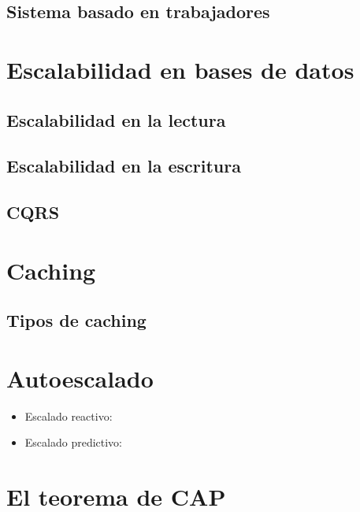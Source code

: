 \documentclass[11pt,a4paper]{article}
\begin{document}
\subsection{Sistema basado en trabajadores}

\section{Escalabilidad en bases de datos}

\subsection{Escalabilidad en la lectura}

\subsection{Escalabilidad en la escritura}

\subsection{CQRS}

\section{Caching}

\subsection{Tipos de caching}

\section{Autoescalado}

\begin{itemize}
\item Escalado reactivo:
\item Escalado predictivo:
\end{itemize}

\section{El teorema de CAP}
\end{document}
